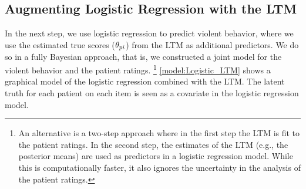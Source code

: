 \documentclass[a4paper,11pt]{article}
\begin{document}
\subsection{Augmenting Logistic Regression with the LTM}
In the next step, we use logistic regression to predict violent behavior, where we use the estimated true scores ($\theta_{pi}$) from the LTM as additional predictors.
We do so in a fully Bayesian approach, that is, we constructed a joint model for the violent behavior and the patient ratings.%
\footnote{%
An alternative is a two-step approach where in the first step the LTM is fit to the patient ratings.
In the second step, the estimates of the LTM (e.g., the posterior means) are used as predictors in a logistic regression model.
While this is computationally faster, it also ignores the uncertainty in the analysis of the patient ratings.
}
\autoref{model:Logistic_LTM} shows a graphical model of the logistic regression combined with the LTM.
The latent truth for each patient on each item is seen as a covariate in the logistic regression model.
\end{document}
